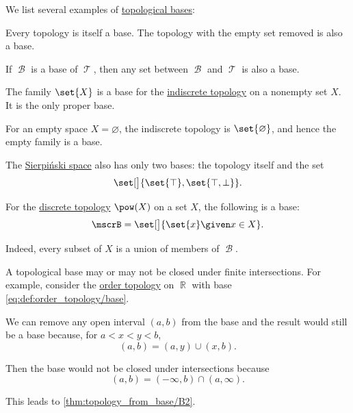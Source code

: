 \begin{example}\label{ex:def:topological_base}
  We list several examples of \hyperref[def:topological_base]{topological bases}:
  \begin{thmenum}
     Every topology is itself a base. The topology with the empty set removed is also a base.

     If \( \mscrB \) is a base of \( \mscrT \), then any set between \( \mscrB \) and \( \mscrT \) is also a base.

     The family \( \set{ X } \) is a base for the \hyperref[def:indiscrete_topology]{indiscrete topology} on a nonempty set \( X \). It is the only proper base.

    For an empty space \( X = \varnothing \), the indiscrete topology is \( \set{ \varnothing } \), and hence the empty family is a base.

     The \hyperref[def:sierpinski_space]{Sierpi\'nski space} also has only two bases: the topology itself and the set
    \begin{equation*}
      \set[\big]{ \set{ \top }, \set{ \top, \bot } }.
    \end{equation*}

     For the \hyperref[def:discrete_topology]{discrete topology} \( \pow(X) \) on a set \( X \), the following is a base:
    \begin{equation*}
      \mscrB = \set[\big]{ \set{ x } \given x \in X }.
    \end{equation*}

    Indeed, every subset of \( X \) is a union of members of \( \mscrB \).

     A topological base may or may not be closed under finite intersections. For example, consider the \hyperref[def:order_topology]{order topology} on \( \BbbR \) with base \eqref{eq:def:order_topology/base}.

    We can remove any open interval \( (a, b) \) from the base and the result would still be a base because, for \( a < x < y < b \),
    \begin{equation*}
      (a, b) = (a, y) \cup (x, b).
    \end{equation*}

    Then the base would not be closed under intersections because
    \begin{equation*}
      (a, b) = (-\infty, b) \cap (a, \infty).
    \end{equation*}

    This leads to \ref{thm:topology_from_base/B2}.
  \end{thmenum}
\end{example}

